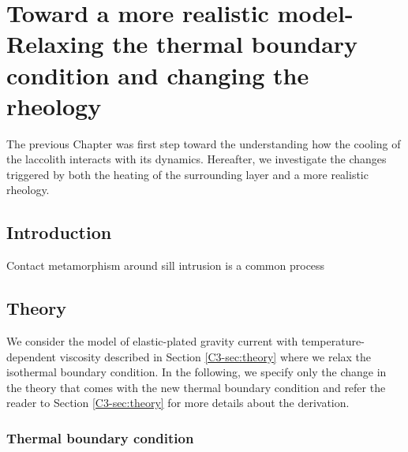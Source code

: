 
\chapter{Toward a more realistic model- Relaxing the thermal boundary
  condition and changing the rheology}
\label{Heating}

\minitoc
The previous Chapter  was first step toward the  understanding how the
cooling of the  laccolith interacts with its  dynamics.  Hereafter, we
investigate  the  changes  triggered  by   both  the  heating  of  the
surrounding layer and a more realistic rheology.

\section{Introduction}
\label{C4-sec:introduction}
 
Contact metamorphism around sill intrusion is a common process

\citep{Everett:2008tn}

\section{Theory}
\label{C4-sec:theory-1}

We  consider   the  model  of  elastic-plated   gravity  current  with
temperature-dependent viscosity described  in Section \ref{C3-sec:theory}
where we relax the isothermal boundary condition. In the following, we
specify only the change in the  theory that comes with the new thermal
boundary condition  and refer  the reader to  Section \ref{C3-sec:theory}
for more details about the derivation.

\subsection{Thermal boundary condition}
\label{C4-sec:formulation-1}

